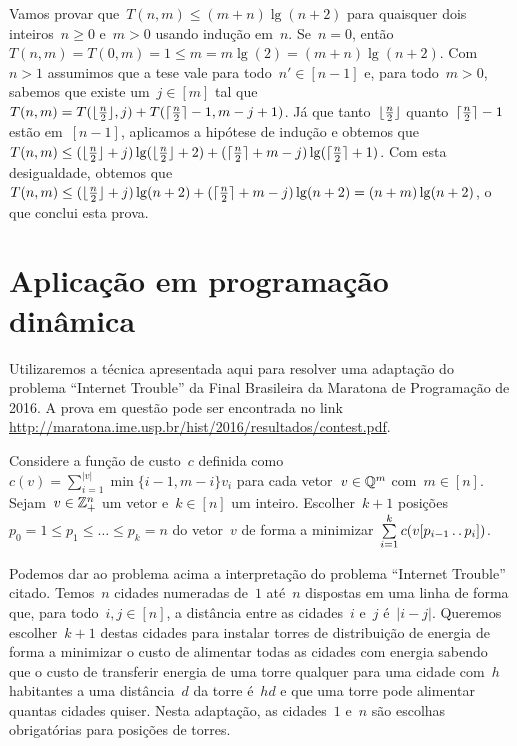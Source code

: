 Vamos provar que~$T(n,m) \leq (m+n)\lg(n + 2)$ para quaisquer dois inteiros~${ n \geq 0 }$ e~$m > 0$ usando indução em~$n$. Se~${ n = 0 }$, então~${ T(n,m) = T(0,m) = 1 \leq m = m\lg(2) =  (m + n)\lg(n+2) }$. Com~${ n > 1 }$ assumimos que a tese vale para todo~${ n' \in [n-1] }$ e, para todo~$m > 0$, sabemos que existe um~${ j \in [m] }$ tal que~${ T(n,m) = T(\lfloor \frac{n}{2} \rfloor,j) + T(\lceil \frac{n}{2} \rceil - 1, m - j + 1) }$. Já que tanto~$\lfloor \frac{n}{2} \rfloor$ quanto~$\lceil \frac{n}{2} \rceil - 1$ estão em~$[n-1]$, aplicamos a hipótese de indução e obtemos que~${ T(n,m) \leq (\lfloor \frac{n}{2} \rfloor + j)\lg(\lfloor \frac{n}{2} \rfloor + 2) + (\lceil \frac{n}{2} \rceil + m - j)\lg(\lceil \frac{n}{2} \rceil + 1) }$. Com esta desigualdade, obtemos que~${ T(n,m) \leq (\lfloor \frac{n}{2} \rfloor + j)\lg(n + 2) + (\lceil \frac{n}{2} \rceil + m - j)\lg(n + 2) = (n + m)\lg(n+2) }$, o que conclui esta prova.


\section{Aplicação em programação dinâmica} \label{DivConq:DP}

Utilizaremos a técnica apresentada aqui para resolver uma adaptação do problema ``Internet Trouble'' da Final Brasileira da Maratona de Programação de 2016. A prova em questão pode ser encontrada no link \url{http://maratona.ime.usp.br/hist/2016/resultados/contest.pdf}.  

\begin{prob} \label{DivConq:InternetTrouble}
Considere a função de custo~$c$ definida como~${ c(v) = \sum\limits_{i=1}^{|v|} \min\{i-1,m-i\} v_i }$ para cada vetor~${ v \in \mathbb{Q}^m }$ com~${ m \in [n] }$. Sejam~${ v \in \mathbb{Z}_+^n }$ um vetor e~$k \in [n]$ um inteiro. Escolher~$k+1$ posições~${ p_0 = 1 \leq p_1 \leq \dots \leq p_k = n }$ do vetor~$v$ de forma a minimizar~${ \sum\limits_{ i = 1 }^k c(v[p_{i-1} \,.\,.\, p_i]) }$.
\end{prob}

Podemos dar ao problema acima a interpretação do problema ``Internet Trouble'' citado. Temos~$n$ cidades numeradas de~$1$ até~$n$ dispostas em uma linha de forma que, para todo~$i,j \in [n]$, a distância entre as cidades~$i$ e~$j$ é~$|i-j|$. Queremos escolher~${ k + 1 }$ destas cidades para instalar torres de distribuição de energia de forma a minimizar o custo de alimentar todas as cidades com energia sabendo que o custo de transferir energia de uma torre qualquer para uma cidade com~$h$ habitantes a uma distância~$d$ da torre é~$hd$ e que uma torre pode alimentar quantas cidades quiser. Nesta adaptação, as cidades~$1$ e~$n$ são escolhas obrigatórias para posições de torres. 

